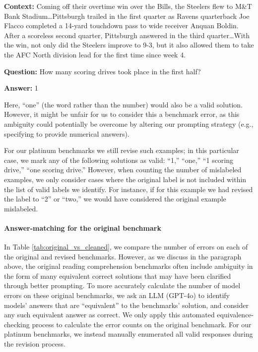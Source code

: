 \begin{tcolorbox}[colback=gray!6, colframe=gray!50, arc=2mm, boxrule=0.5pt]
\textbf{Context:} Coming off their overtime win over the Bills, the Steelers flew to M\&T Bank Stadium\ldots Pittsburgh trailed in the first quarter as Ravens quarterback Joe Flacco completed a 14-yard touchdown pass to wide receiver Anquan Boldin.  After a scoreless second quarter, Pittsburgh answered in the third quarter\ldots With the win, not only did the Steelers improve to 9-3, but it also allowed them to take the AFC North division lead for the first time since week 4.

\medskip

\textbf{Question:} How many scoring drives took place in the first half?

\medskip
    
\textbf{Answer:} 1
\end{tcolorbox}

\noindent Here, ``one'' (the word rather than the number) would also be a valid solution. However, it might be unfair for us to consider this a benchmark error, as this ambiguity could potentially be overcome by altering our prompting strategy (e.g., specifying to provide numerical answers). 

For our platinum benchmarks we still revise such examples; in this particular case, we mark any of the following solutions as valid: ``1,'' ``one,'' ``1 scoring drive,'' ``one scoring drive.'' However, when counting the number of mislabeled examples, we only consider cases where the original label is not included within the list of valid labels we identify. For instance, if for this example we had revised the label to ``2'' or ``two,'' we would have considered the original example mislabeled.

\paragraph{Answer-matching for the original benchmark}
In Table \ref{tab:original_vs_cleaned}, we compare the number of errors on each of the original and revised benchmarks. However, as we discuss in the paragraph above, the original reading comprehension benchmarks often include ambiguity in the form of many equivalent correct solutions that may have been clarified through better prompting. To more accurately calculate the number of model errors on these original benchmarks, we ask an LLM (GPT-4o) to identify models' answers that are ``equivalent'' to the benchmarks' solution, and consider any such equivalent answer as correct. We only apply this automated equivalence-checking process to calculate the error counts on the original benchmark. For our platinum benchmarks, we instead manually enumerated all valid responses during the revision process.


